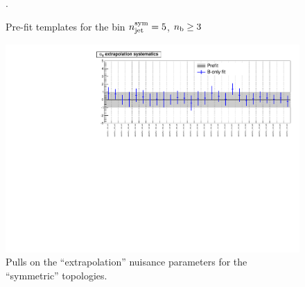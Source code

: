 \newpage
\begin{figure}[h!]
\caption{Pre-fit \MHT templates for the bin $n_{\mathrm{jet}}^{\mathrm{sym}}=5$, $n_{\text{b}}\ge 3$ \label{fig:postFitShapes_ge3b_ge5j}}.
\begin{center}
    \hspace{1cm}
\end{center}
\end{figure}




\newpage
\begin{landscape}
\begin{figure}[h!]
\caption{Pulls on the ``\alt extrapolation'' nuisance parameters for the ``symmetric'' topologies.\label{fig:nuisPull_alphaT_sym}}
    \includegraphics[width=\linewidth]{figures/postFitResults/nuisances/alphaT_sym_ALL_nuisances.pdf}
\end{figure}
\end{landscape}




